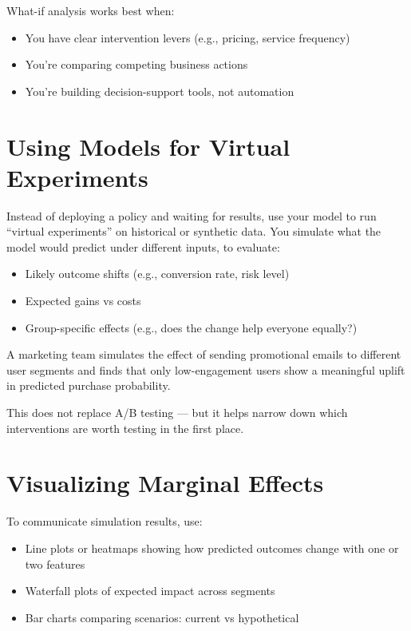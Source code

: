 \documentclass[12pt,openany]{book}
\begin{document}
What-if analysis works best when:
\begin{itemize}
  \item You have clear intervention levers (e.g., pricing, service frequency)
  \item You're comparing competing business actions
  \item You're building decision-support tools, not automation
\end{itemize}

\section{Using Models for Virtual Experiments}

Instead of deploying a policy and waiting for results, use your model to run “virtual experiments” on historical or synthetic data. You simulate what the model would predict under different inputs, to evaluate:
\begin{itemize}
  \item Likely outcome shifts (e.g., conversion rate, risk level)
  \item Expected gains vs costs
  \item Group-specific effects (e.g., does the change help everyone equally?)
\end{itemize}

\begin{examplebox}
A marketing team simulates the effect of sending promotional emails to different user segments and finds that only low-engagement users show a meaningful uplift in predicted purchase probability.
\end{examplebox}

\begin{notebox}
This does not replace A/B testing — but it helps narrow down which interventions are worth testing in the first place.
\end{notebox}

\section{Visualizing Marginal Effects}

To communicate simulation results, use:
\begin{itemize}
  \item Line plots or heatmaps showing how predicted outcomes change with one or two features
  \item Waterfall plots of expected impact across segments
  \item Bar charts comparing scenarios: current vs hypothetical
\end{itemize}
\end{document}
